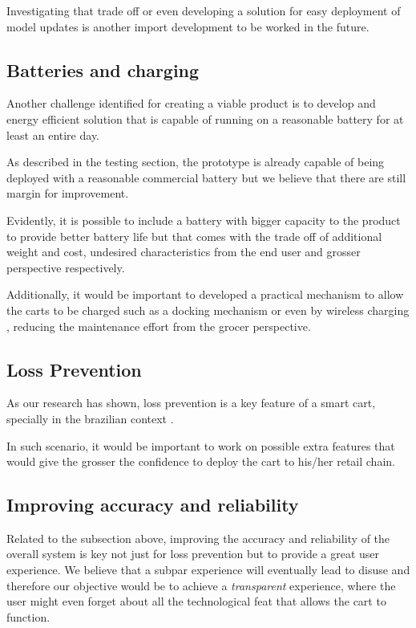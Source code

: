 \documentclass[openright]{normas-utf-tex} %
\begin{document}
Investigating that trade off or even developing a solution for easy deployment
of model updates is another import development to be worked in the future. 

\subsection{Batteries and charging}

Another challenge identified for creating a viable product is to develop and
energy efficient solution that is capable of running on a reasonable battery
for at least an entire day.

As described in the testing section, the prototype is already capable of being
deployed with a reasonable commercial battery but we believe that there are
still margin for improvement.

Evidently, it is possible to include a battery with bigger capacity to the
product to provide better battery life but that comes with the trade off of
additional weight and cost, undesired characteristics from the end user and
grosser perspective respectively.

Additionally, it would be important to developed a practical mechanism to allow
the carts to be charged such as a docking mechanism or even by wireless
charging \cite{Treffers2015}, reducing the maintenance effort from the grocer
perspective. 

\subsection{Loss Prevention}

As our research has shown, loss prevention is a key feature of a smart cart, specially in the brazilian context
\cite{Nextop2022}.

In such scenario, it would be important to work on possible extra features that
would give the grosser the confidence to deploy the cart to his/her retail
chain.

\subsection{Improving accuracy and reliability}

Related to the subsection above, improving the accuracy and reliability of the
overall system is key not just for loss prevention but to provide a great user
experience. We believe that a subpar experience will eventually lead to disuse
and therefore our objective would be to achieve a \textit{transparent}
experience, where the user might even forget about all the technological feat
that allows the cart to function.
\end{document}
